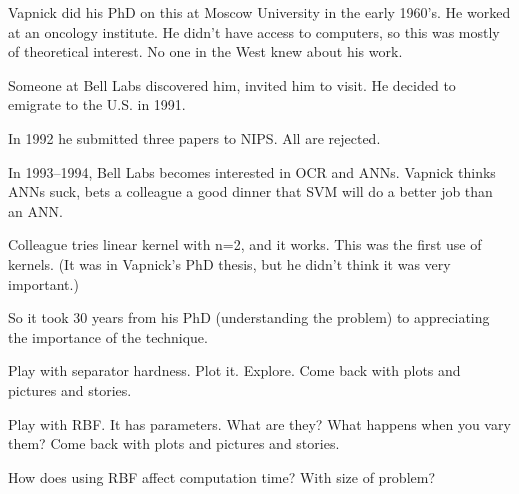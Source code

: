 

Vapnick did his PhD on this at Moscow University in the early 1960's.
He worked at an oncology institute.  He didn't have access to
computers, so this was mostly of theoretical interest.  No one in the
West knew about his work.

Someone at Bell Labs discovered him, invited him to visit.  He decided
to emigrate to the U.S. in 1991.

In 1992 he submitted three papers to NIPS.  All are rejected.

In 1993--1994, Bell Labs becomes interested in OCR and ANNs.  Vapnick
thinks ANNs suck, bets a colleague a good dinner that SVM will do a
better job than an ANN.

Colleague tries linear kernel with n=2, and it works.  This was the
first use of kernels.  (It was in Vapnick's PhD thesis, but he didn't
think it was very important.)

So it took 30 years from his PhD (understanding the problem) to
appreciating the importance of the technique.



Play with separator hardness.  Plot it.  Explore.  Come back with
plots and pictures and stories.

Play with RBF.  It has parameters.  What are they?  What happens when
you vary them?  Come back with plots and pictures and stories.

How does using RBF affect computation time?  With size of problem?


